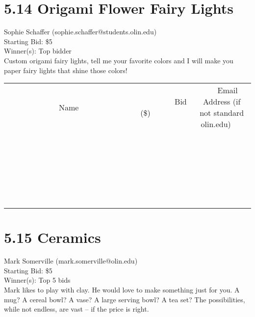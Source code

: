 \documentclass[11pt]{article}
\begin{document}
\section*{5.14 Origami Flower Fairy Lights}
Sophie Schaffer (sophie.schaffer@students.olin.edu) \\
Starting Bid: \$5 \\
Winner(s): 
Top bidder \\
Custom origami fairy lights, tell me your favorite colors and I will make you paper fairy lights that shine those colors! \\[6ex]
\begin{tabular}{c c c}
~~~~~~~~~~~~~Name~~~~~~~~~~~~~ & ~~~~~~~~~Bid (\$)~~~~~~~~~ & ~~~Email Address (if not standard olin.edu)~~~ \\
 & & \\
\hline
 & & \\
\hline
 & & \\
\hline
 & & \\
\hline
 & & \\
\hline
 & & \\
\hline
 & & \\
\hline
 & & \\
\hline
 & & \\
\hline
 & & \\
\hline
 & & \\
\hline
 & & \\
\hline
 & & \\
\hline
 & & \\
\hline
 & & \\
\hline
 & & \\
\hline
 & & \\
\hline
 & & \\
\hline
 & & \\
\hline
 & & \\
\hline
 & & \\
\hline
 & & \\
\hline
 & & \\
\hline
 & & \\
\hline
 & & \\
\hline
 & & \\
\hline
\end{tabular}
\clearpage
\section*{5.15 Ceramics}
Mark Somerville (mark.somerville@olin.edu) \\
Starting Bid: \$5 \\
Winner(s): 
Top 5 bids \\
Mark likes to play with clay.  He would love to make something just for you.  A mug?  A cereal bowl?  A vase?  A large serving bowl?  A tea set?  The possibilities, while not endless, are vast -- if the price is right.
\end{document}
